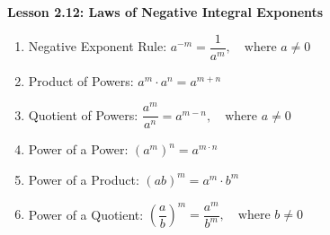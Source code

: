 \begin{center}
\textbf{Lesson 2.12: Laws of Negative Integral Exponents}
\end{center}

\vspace*{1ex}

\begin{enumerate}[noitemsep, label = \color{blue}\arabic*. ]
    \item Negative Exponent Rule: \( a^{-m} = \dfrac{1}{a^m}, \quad \text{where } a \neq 0 \)
    \item Product of Powers: \( a^m \cdot a^n = a^{m+n} \)
    \item Quotient of Powers:  \( \dfrac{a^m}{a^n} = a^{m-n}, \quad \text{where } a \neq 0 \)
    \item Power of a Power: \( (a^m)^n = a^{m \cdot n} \)
    \item Power of a Product: \( (ab)^m = a^m \cdot b^m \)
    \item Power of a Quotient: \( \left( \dfrac{a}{b} \right)^m = \dfrac{a^m}{b^m}, \quad \text{where } b \neq 0 \)
\end{enumerate}

